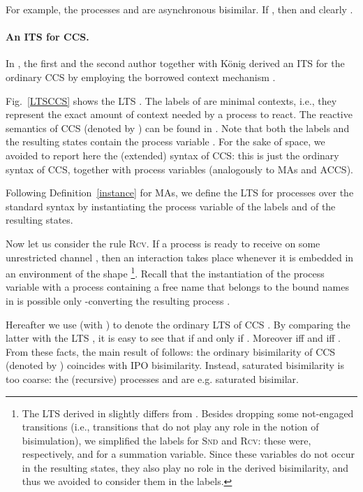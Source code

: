 \documentclass[copyright,creativecommons]{eptcs}
\newcommand{\<}{\langle}
\renewcommand{\>}{\rangle}
\begin{document}
For example, the processes  and 
are asynchronous bisimilar. If , then  and clearly .


\paragraph{An ITS for CCS.}
In \cite{bgk:bisimulation-graph-enc}, the first and the second
author together with K\"onig derived an ITS for the
ordinary CCS by employing the borrowed context mechanism
\cite{EK:06}.

Fig.~\ref{LTSCCS} shows the LTS . The labels of
 are minimal contexts, i.e., they represent the exact
amount of context needed by a process to react. The reactive
semantics of CCS (denoted by ) can be found in
\cite{Mil:PPCA}. Note that both the labels and the resulting states
contain the process variable . For the sake of space, we avoided to
report here the (extended) syntax of CCS: this is just the ordinary
syntax of CCS, together with process variables
(analogously to MAs and ACCS).

Following Definition~\ref{instance} for MAs, we define the LTS  for processes
over the standard syntax by instantiating the process variable
of the labels and of the resulting states.

Now let us consider the rule \textsc{Rcv}. If a process is ready
to receive on some unrestricted channel , then an interaction
takes place whenever it is embedded in an environment of the shape
\footnote{The LTS derived in
\cite{bgk:bisimulation-graph-enc} slightly differs from
. Besides dropping some not-engaged transitions (i.e.,
transitions that do not play any role in the notion of
bisimulation), we simplified the labels for \textsc{Snd} and \textsc{Rcv}:
these were, respectively,  and  for
 a summation variable. Since these variables do not occur in
the resulting states, they also play no role in the derived bisimilarity, and thus
we avoided to consider them in the labels.}. Recall that
the instantiation of the process variable  with a process
containing a free name that belongs to the bound names in  is
possible only -converting the resulting process .

Hereafter we use  (with ) to denote the ordinary LTS of CCS
\cite{MIL:CAC}. By comparing the latter with the LTS , it
is easy to see that  if and only if .
Moreover  iff  and
 iff . From these
facts, the main result of \cite{bgk:bisimulation-graph-enc}
follows: the ordinary bisimilarity of CCS (denoted by )
coincides with IPO bisimilarity. Instead, saturated bisimilarity is
too coarse: the (recursive) processes
 and  are e.g. saturated bisimilar.
\end{document}
